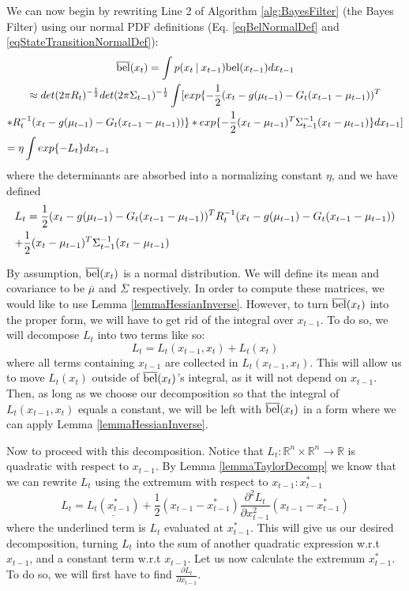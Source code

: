We can now begin by rewriting Line 2 of Algorithm \ref{alg:BayesFilter} (the Bayes Filter) using our normal PDF definitions (Eq. \ref{eqBelNormalDef} and \ref{eqStateTransitionNormalDef}):
\begin{multline} \label{eqBelBarLt}
\overline{\bel}(x_t) = \int p(x_t \mathbin{\vert} x_{t-1}) \bel(x_{t-1})dx_{t-1} \\
\approx det(2 \pi R_t)^{-\frac{1}{2}} det(2 \pi \Sigma_{t-1})^{-\frac{1}{2}} \int [ exp\{-\frac{1}{2} (x_t - g(\mu_{t-1}) - G_t (x_{t-1} - \mu_{t-1}))^T \\ * R_t^{-1} (x_t - g(\mu_{t-1}) - G_t (x_{t-1} - \mu_{t-1}))\} * exp \{-\frac{1}{2} (x_t - \mu_{t-1})^T \Sigma_{t-1}^{-1} (x_t - \mu_{t-1}) \}dx_{t-1} ] \\
= \eta \int exp\{-L_t\}dx_{t-1} \hfill
\end{multline}
where the determinants are absorbed into a normalizing constant \(\eta\), and we have defined
\begin{multline}
L_t = \frac{1}{2} (x_t - g(\mu_{t-1}) - G_t (x_{t-1} - \mu_{t-1}))^T R_t^{-1} (x_t - g(\mu_{t-1}) - G_t (x_{t-1} - \mu_{t-1}))\\
+ \frac{1}{2} (x_t - \mu_{t-1})^T \Sigma_{t-1}^{-1} (x_t - \mu_{t-1}) \hfill
\end{multline}

By assumption, \(\overline{\mathrm{bel}}(x_t)\) is a normal distribution. We will define its mean and covariance to be \(\overline{\mu}\) and \(\overline{\Sigma}\) respectively. In order to compute these matrices, we would like to use Lemma \ref{lemmaHessianInverse}. However, to turn \(\overline{\mathrm{bel}}(x_t)\) into the proper form, we will have to get rid of the integral over \(x_{t-1}\). To do so, we will decompose \(L_t\) into two terms like so: \begin{equation} \label{eqLtDecomp}
L_t = L_t(x_{t-1},x_t) + L_t(x_t)
\end{equation}
where all terms containing \(x_{t-1}\) are collected in \(L_t(x_{t-1},x_t)\). This will allow us to move \(L_t(x_t)\) outside of \(\overline{\mathrm{bel}}(x_t)\)'s integral, as it will not depend on \(x_{t-1}\). Then, as long as we choose our decomposition so that the integral of \(L_t(x_{t-1},x_t)\) equals a constant, we will be left with \(\overline{\mathrm{bel}}(x_t)\) in a form where we can apply Lemma \ref{lemmaHessianInverse}.

Now to proceed with this decomposition. Notice that \(L_t : \mathbb{R}^n \times \mathbb{R}^n \to \mathbb{R}\) is quadratic with respect to \(x_{t-1}\). By Lemma \ref{lemmaTaylorDecomp} we know that we can rewrite \(L_t\) using the extremum with respect to \(x_{t-1}: x_{t-1}^*\) \[
L_t = \underline{L_t(x_{t-1}^*)} + \frac{1}{2} (x_{t-1} - x_{t-1}^*) \frac{\partial^2 L_t}{\partial x_{t-1}^2} (x_{t-1} - x_{t-1}^*)
\] 
where the underlined term is \(L_t\) evaluated at \(x_{t-1}^*\). This will give us our desired decomposition, turning \(L_t\) into the sum of another quadratic expression w.r.t \(x_{t-1}\), and a constant term w.r.t \(x_{t-1}\). Let us now calculate the extremum \(x_{t-1}^*\). To do so, we will first have to find \(\frac{\partial L_t}{\partial x_{t-1}}\).

